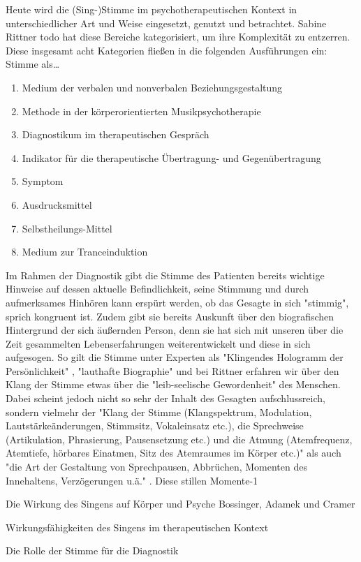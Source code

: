 Heute wird die (Sing-)Stimme im psychotherapeutischen Kontext in unterschiedlicher Art und Weise eingesetzt, genutzt und betrachtet. Sabine Rittner todo hat diese Bereiche kategorisiert, um ihre Komplexität zu entzerren. Diese insgesamt acht Kategorien fließen in die folgenden Ausführungen ein: 
Stimme als\ldots
\begin{enumerate}
\item Medium der verbalen und nonverbalen Beziehungsgestaltung
\item Methode in der körperorientierten Musikpsychotherapie
\item Diagnostikum im therapeutischen Gespräch
\item Indikator für die therapeutische Übertragung- und Gegenübertragung
\item Symptom
\item Ausdrucksmittel
\item Selbstheilungs-Mittel
\item Medium zur Tranceinduktion
\end{enumerate}

Im Rahmen der Diagnostik gibt die Stimme des Patienten bereits wichtige Hinweise auf dessen aktuelle Befindlichkeit, seine Stimmung und durch aufmerksames Hinhören kann erspürt werden, ob das Gesagte in sich "stimmig", sprich kongruent ist. Zudem gibt sie bereits Auskunft über den biografischen Hintergrund der sich äußernden Person, denn sie hat sich mit unseren über die Zeit gesammelten Lebenserfahrungen weiterentwickelt und diese in sich aufgesogen. So gilt die Stimme unter Experten als "Klingendes Hologramm der Persönlichkeit" \autocite{adamek1999}, "lauthafte Biographie" \autocite{gundermann1994} und bei Rittner erfahren wir über den Klang der Stimme etwas über die "leib-seelische Gewordenheit" \autocite[211]{rittner2008} des Menschen.
Dabei scheint jedoch nicht so sehr der Inhalt des Gesagten aufschlussreich, sondern vielmehr der "Klang der Stimme (Klangspektrum, Modulation, Lautstärkeänderungen, Stimmsitz, Vokaleinsatz etc.), die Sprechweise (Artikulation, Phrasierung, Pausensetzung etc.) und die Atmung (Atemfrequenz, Atemtiefe, hörbares Einatmen, Sitz des Atemraumes im Körper etc.)" als auch "die Art der Gestaltung von Sprechpausen, Abbrüchen, Momenten des Innehaltens, Verzögerungen u.ä." \autocite[210]{rittner2008}. Diese stillen Momente-1


Die Wirkung des Singens auf Körper und Psyche
Bossinger, Adamek und Cramer

Wirkungsfähigkeiten des Singens im therapeutischen Kontext

Die Rolle der Stimme für die Diagnostik




\newpage\thispagestyle{empty}
